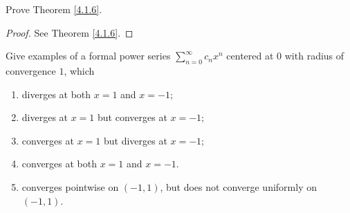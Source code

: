 \exercisesection

\begin{exercise}\label{ex 4.1.1}
    Prove Theorem \ref{4.1.6}.
\end{exercise}

\begin{proof}
    See Theorem \ref{4.1.6}.
\end{proof}

\begin{exercise}\label{ex 4.1.2}
    Give examples of a formal power series \(\sum_{n = 0}^\infty c_n x^n\) centered at \(0\) with radius of convergence \(1\), which
    \begin{enumerate}
        \item diverges at both \(x = 1\) and \(x = -1\);
        \item diverges at \(x = 1\) but converges at \(x = -1\);
        \item converges at \(x = 1\) but diverges at \(x = -1\);
        \item converges at both \(x = 1\) and \(x = -1\).
        \item converges pointwise on \((-1, 1)\), but does not converge uniformly on \((-1, 1)\).
    \end{enumerate}
\end{exercise}